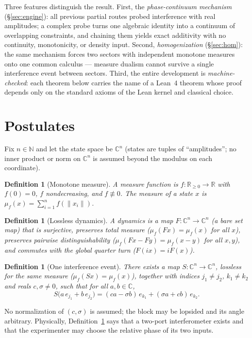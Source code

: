 \documentclass[11pt]{article}
\newtheorem{definition}[theorem]{Definition}
\newcommand{\R}{\mathbb{R}}
\newcommand{\C}{\mathbb{C}}
\newcommand{\norm}[1]{\lVert #1 \rVert}
\begin{document}
Three features distinguish the result.  First, the \emph{phase-continuum
mechanism} (\S\ref{sec:engine}): all previous partial routes probed
interference with real amplitudes; a complex probe turns one algebraic
identity into a continuum of overlapping constraints, and chaining them
yields exact additivity with no continuity, monotonicity, or density
input.  Second, \emph{homogenization} (\S\ref{sec:hom}): the same
mechanism forces two sectors with independent monotone measures onto
one common calculus --- measure dualism cannot survive a single
interference event between sectors.  Third, the entire development is
\emph{machine-checked}: each theorem below carries the name of a
Lean~4 theorem whose proof depends only on the standard axioms of the
Lean kernel and classical choice.

\section{Postulates}\label{sec:setup}

Fix $n\in\mathbb{N}$ and let the state space be $\C^n$ (states are
tuples of ``amplitudes''; no inner product or norm on $\C^n$ is
assumed beyond the modulus on each coordinate).

\begin{definition}[Monotone measure]
A \emph{measure function} is $f:\R_{\ge0}\to\R$ with $f(0)=0$,
$f$ nondecreasing, and $f\not\equiv 0$.  The measure of a state $x$ is
$\mu_f(x)=\sum_{i=1}^n f(\norm{x_i})$.
\end{definition}

\begin{definition}[Lossless dynamics]\label{def:dyn}
A dynamics is a map $F:\C^n\to\C^n$ (a bare set map) that is
surjective, preserves total measure
($\mu_f(Fx)=\mu_f(x)$ for all $x$), preserves pairwise
distinguishability ($\mu_f(Fx-Fy)=\mu_f(x-y)$ for all $x,y$), and
commutes with the global quarter turn ($F(ix)=iF(x)$).
\end{definition}

\begin{definition}[One interference event]\label{def:split}
There exists a map $S:\C^n\to\C^n$, lossless for the same measure
($\mu_f(Sx)=\mu_f(x)$), together with indices $j_1\ne j_2$,
$k_1\ne k_2$ and reals $c,\sigma\ne 0$, such that for all
$a,b\in\C$,
\[
S\bigl(a\,e_{j_1}+b\,e_{j_2}\bigr)
=(ca-\sigma b)\,e_{k_1}+(\sigma a+c b)\,e_{k_2}.
\]
\end{definition}
No normalization of $(c,\sigma)$ is assumed; the block may be lopsided
and its angle arbitrary.  Physically, Definition~\ref{def:split} says
that a two-port interferometer exists and that the experimenter may
choose the relative phase of its two inputs.
\end{document}
